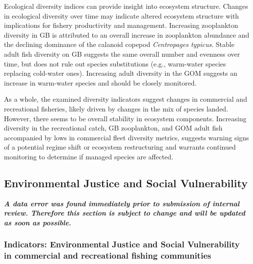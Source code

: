 \documentclass[
  10pt,
]{article}
\begin{document}
Ecological diversity indices can provide insight into ecosystem structure. Changes in ecological diversity over time may indicate altered ecosystem structure with implications for fishery productivity and management. Increasing zooplankton diversity in GB is attributed to an overall increase in zooplankton abundance and the declining dominance of the calanoid copepod \emph{Centropages typicus}. Stable adult fish diversity on GB suggests the same overall number and evenness over time, but does not rule out species substitutions (e.g., warm-water species replacing cold-water ones). Increasing adult diversity in the GOM suggests an increase in warm-water species and should be closely monitored.

As a whole, the examined diversity indicators suggest changes in commercial and recreational fisheries, likely driven by changes in the mix of species landed. However, there seems to be overall stability in ecosystem components. Increasing diversity in the recreational catch, GB zooplankton, and GOM adult fish accompanied by lows in commercial fleet diversity metrics, suggests warning signs of a potential regime shift or ecosystem restructuring and warrants continued monitoring to determine if managed species are affected.

\hypertarget{environmental-justice-and-social-vulnerability}{%
\subsection{Environmental Justice and Social Vulnerability}\label{environmental-justice-and-social-vulnerability}}

\textbf{\emph{A data error was found immediately prior to submission of internal review. Therefore this section is subject to change and will be updated as soon as possible.}}

\hypertarget{indicators-environmental-justice-and-social-vulnerability-in-commercial-and-recreational-fishing-communities}{%
\subsubsection{Indicators: Environmental Justice and Social Vulnerability in commercial and recreational fishing communities}\label{indicators-environmental-justice-and-social-vulnerability-in-commercial-and-recreational-fishing-communities}}
\end{document}
